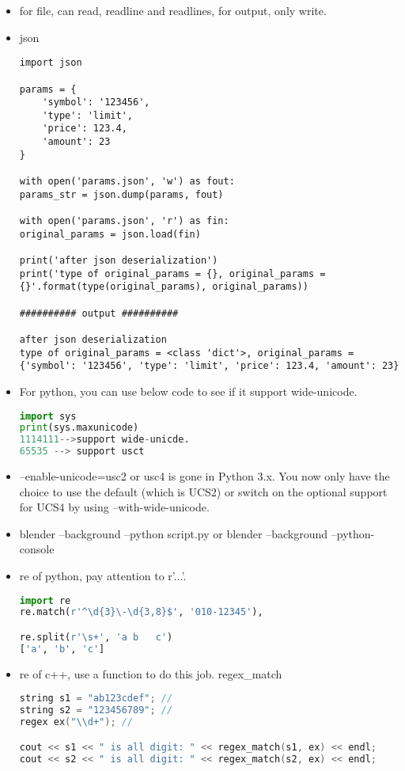 \documentclass[a4paper,12pt,twoside]{book}
\begin{document}
\begin{itemize}
	\item for file, can read, readline and readlines, for output, only write.
	
	\item json
\begin{lstlisting}
import json

params = {
	'symbol': '123456',
	'type': 'limit',
	'price': 123.4,
	'amount': 23
}

with open('params.json', 'w') as fout:
params_str = json.dump(params, fout)

with open('params.json', 'r') as fin:
original_params = json.load(fin)

print('after json deserialization')
print('type of original_params = {}, original_params = {}'.format(type(original_params), original_params))

########## output ##########

after json deserialization
type of original_params = <class 'dict'>, original_params = {'symbol': '123456', 'type': 'limit', 'price': 123.4, 'amount': 23}	
\end{lstlisting}
	
	\item For python, you can use below code to see if it support wide-unicode.
\begin{lstlisting}[frame=single, language=python]
import sys
print(sys.maxunicode) 
1114111-->support wide-unicde.
65535 --> support usct	
\end{lstlisting} 	
	
	\item --enable-unicode=usc2 or usc4 is gone in Python 3.x. You now only have the choice to use the default (which is UCS2) or switch on the optional support for UCS4 by using --with-wide-unicode.
	
	\item blender --background --python script.py or blender --background --python-console
	
	\item re of python, pay attention to r'...'.
\begin{lstlisting}[frame=single, language=python, mathescape=false]
import re
re.match(r'^\d{3}\-\d{3,8}$', '010-12345'), 

re.split(r'\s+', 'a b   c')
['a', 'b', 'c']
\end{lstlisting} 

	\item re of c++, use a function to do this job. regex\_match
\begin{lstlisting}[frame=single, language=c++]
string s1 = "ab123cdef"; //
string s2 = "123456789"; //
regex ex("\\d+"); //

cout << s1 << " is all digit: " << regex_match(s1, ex) << endl; 
cout << s2 << " is all digit: " << regex_match(s2, ex) << endl; 
\end{lstlisting} 

	
\end{itemize}
\end{document}
